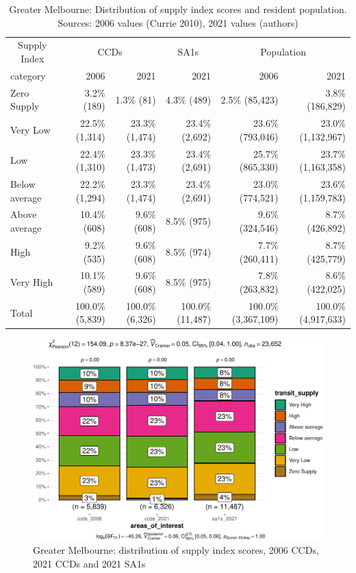 \documentclass[preprint, 3p,
authoryear]{elsarticle} %
\begin{document}
\begin{table}

\caption{\label{tab:Greater_Melbourne_SA1_2021_table}Greater Melbourne: Distribution of supply index scores and resident population. Sources: 2006 values (Currie 2010), 2021 values (authors)}
\centering
\begin{tabular}[t]{l|r|r|r|r|r}
\hline
\multicolumn{1}{c|}{Supply Index} & \multicolumn{2}{c|}{CCDs} & \multicolumn{1}{c|}{SA1s} & \multicolumn{2}{c}{Population} \\
\cline{1-1} \cline{2-3} \cline{4-4} \cline{5-6}
category & 2006 & 2021 & 2021 & 2006 & 2021\\
\hline
Zero Supply & 3.2\%   (189) & 1.3\%    (81) & 4.3\%    (489) & 2.5\%    (85,423) & 3.8\%   (186,829)\\
\hline
Very Low & 22.5\% (1,314) & 23.3\% (1,474) & 23.4\%  (2,692) & 23.6\%   (793,046) & 23.0\% (1,132,967)\\
\hline
Low & 22.4\% (1,310) & 23.3\% (1,473) & 23.4\%  (2,691) & 25.7\%   (865,330) & 23.7\% (1,163,358)\\
\hline
Below average & 22.2\% (1,294) & 23.3\% (1,474) & 23.4\%  (2,691) & 23.0\%   (774,521) & 23.6\% (1,159,783)\\
\hline
Above average & 10.4\%   (608) & 9.6\%   (608) & 8.5\%    (975) & 9.6\%   (324,546) & 8.7\%   (426,892)\\
\hline
High & 9.2\%   (535) & 9.6\%   (608) & 8.5\%    (974) & 7.7\%   (260,411) & 8.7\%   (425,779)\\
\hline
Very High & 10.1\%   (589) & 9.6\%   (608) & 8.5\%    (975) & 7.8\%   (263,832) & 8.6\%   (422,025)\\
\hline
Total & 100.0\% (5,839) & 100.0\% (6,326) & 100.0\% (11,487) & 100.0\% (3,367,109) & 100.0\% (4,917,633)\\
\hline
\end{tabular}
\end{table}

\begin{figure}
\centering
\includegraphics{Leveraging_GTFS_to_assess_transit_supply_Transport_Geography_files/figure-latex/Greater_Melbourne_SA1_2021_table-1.pdf}
\caption{Greater Melbourne: distribution of supply index scores, 2006
CCDs, 2021 CCDs and 2021 SA1s}
\end{figure}
\end{document}
